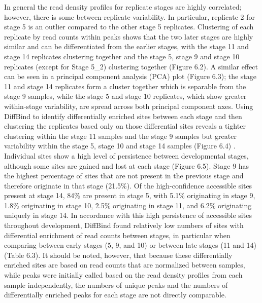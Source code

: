 In general the read density profiles for replicate stages are highly correlated; however, there is some between-replicate variability. In particular, replicate 2 for stage 5 is an outlier compared to the other stage 5 replicates. Clustering of each replicate by read counts within peaks shows that the two later stages are highly similar and can be differentiated from the earlier stages, with the stage 11 and stage 14 replicates clustering together and the stage 5, stage 9 and stage 10 replicates (except for Stage 5\_2) clustering together (Figure 6.2). A similar effect can be seen in a principal component analysis (PCA) plot (Figure 6.3); the stage 11 and stage 14 replicates form a cluster together which is separable from the stage 9 samples, while the stage 5 and stage 10 replicates, which show greater within-stage variability, are spread across both principal component axes. Using DiffBind to identify differentially enriched sites between each stage and then clustering the replicates based only on those differential sites reveals a tighter clustering within the stage 11 samples and the stage 9 samples but greater variability within the stage 5, stage 10 and stage 14 samples (Figure 6.4) \citep{ross-innes_differential_2012-1}.\\

Individual sites show a high level of persistence between developmental stages, although some sites are gained and lost at each stage (Figure 6.5). Stage 9 has the highest percentage of sites that are not present in the previous stage and therefore originate in that stage (21.5\%). Of the high-confidence accessible sites present at stage 14, 84\% are present in stage 5, with 5.1\% originating in stage 9, 1.8\% originating in stage 10, 2.5\% originating in stage 11, and 6.2\% originating uniquely in stage 14. In accordance with this high persistence of accessible sites throughout development, DiffBind found relatively low numbers of sites with differential enrichment of read counts between stages, in particular when comparing between early stages (5, 9, and 10) or between late stages (11 and 14) (Table 6.3). It should be noted, however, that because these differentially enriched sites are based on read counts that are normalized between samples, while peaks were initially called based on the read density profiles from each sample independently, the numbers of unique peaks and the numbers of differentially enriched peaks for each stage are not directly comparable.\\

